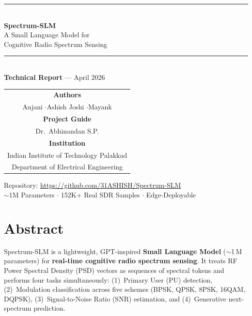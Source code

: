 \documentclass[12pt,a4paper]{article}
\begin{document}
\begin{titlepage}\centering
\vspace*{1.5cm}
\rule{\linewidth}{1pt}\\[0.4cm]
{\Huge\bfseries\color{seccolor}Spectrum-SLM}\\[0.4cm]
{\LARGE\color{iitblue}A Small Language Model for\\Cognitive Radio Spectrum Sensing}\\[0.3cm]
\rule{\linewidth}{1pt}\\[2cm]
{\Large\textbf{Technical Report} --- April 2026}\\[2.5cm]
\begin{tabular}{c}
\textbf{Authors}\\[0.3cm]
{\large Anjani \quad$\cdot$\quad Ashish Joshi \quad$\cdot$\quad Mayank}\\[1cm]
\textbf{Project Guide}\\[0.3cm]
{\large Dr.\ Abhinandan S.P.}\\[1cm]
\textbf{Institution}\\[0.3cm]
{\large Indian Institute of Technology Palakkad}\\
{\large Department of Electrical Engineering}
\end{tabular}
\vfill
{\small\color{gray}Repository: \url{https://github.com/31ASHISH/Spectrum-SLM}}\\[0.3cm]
{\small\color{gray}$\sim$1M Parameters $\cdot$ 152K+ Real SDR Samples $\cdot$ Edge-Deployable}
\end{titlepage}

\tableofcontents\newpage

\section{Abstract}

Spectrum-SLM is a lightweight, GPT-inspired \textbf{Small Language Model} ($\sim$1\,M parameters) for \textbf{real-time cognitive radio spectrum sensing}. It treats RF Power Spectral Density (PSD) vectors as sequences of spectral tokens and performs four tasks simultaneously: (1)~Primary User (PU) detection, (2)~Modulation classification across five schemes (BPSK, QPSK, 8PSK, 16QAM, DQPSK), (3)~Signal-to-Noise Ratio (SNR) estimation, and (4)~Generative next-spectrum prediction.
\end{document}

